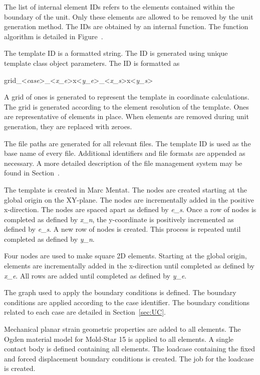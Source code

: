 The list of internal element IDs refers to the elements contained within the boundary of the unit. Only these elements are allowed to be removed by the unit generation method. The IDs are obtained by an internal function. The function algorithm is detailed in Figure~.

The template ID is a formatted string. The ID is generated using unique template class object parameters. The ID is formatted as

\vspace{\baselineskip}

\centerline{grid\_<\textit{case}>\_<\textit{x\_e}>x<\textit{y\_e}>\_<\textit{x\_s}>x<\textit{y\_s}>}

\vspace{\baselineskip}

A grid of ones is generated to represent the template in coordinate calculations. The grid is generated according to the element resolution of the template. Ones are representative of elements in place. When elements are removed during unit generation, they are replaced with zeroes.

The file paths are generated for all relevant files. The template ID is used as the base name of every file. Additional identifiers and file formats are appended as necessary. A more detailed description of the file management system may be found in Section~.

The template is created in Marc Mentat. The nodes are created starting at the global origin on the XY-plane. The nodes are incrementally added in the positive x-direction. The nodes are spaced apart as defined by \textit{e\_s}. Once a row of nodes is completed as defined by \textit{x\_n}, the y-coordinate is positively incremented as defined by \textit{e\_s}. A new row of nodes is created. This process is repeated until completed as defined by \textit{y\_n}.

Four nodes are used to make square 2D elements. Starting at the global origin, elements are incrementally added in the x-direction until completed as defined by \textit{x\_e}. All rows are added until completed as defined by \textit{y\_e}.

The graph used to apply the boundary conditions is defined. The boundary conditions are applied according to the case identifier. The boundary conditions related to each case are detailed in Section~\ref{sec:UC}.

Mechanical planar strain geometric properties are added to all elements. The Ogden material model for Mold-Star 15 is applied to all elements. A single contact body is defined containing all elements. The loadcase containing the fixed and forced displacement boundary conditions is created. The job for the loadcase is created.

